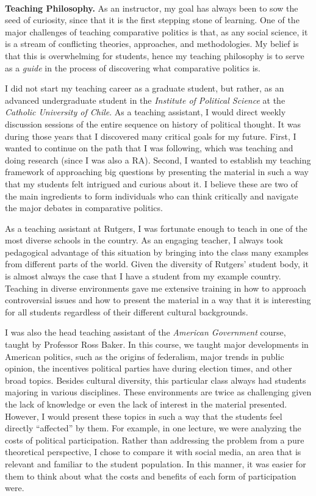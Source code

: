 \vspace{-2cm}{\bf \huge Teaching Statement}\\

{\bf Teaching Philosophy.} As an instructor, my goal has always been to sow the seed of curiosity, since that it is the first stepping stone of learning. One of the major challenges of teaching comparative politics is that, as any social science, it is a stream of conflicting theories, approaches, and methodologies. My belief is that this is overwhelming for students, hence my teaching philosophy is to serve as a \emph{guide} in the process of discovering what comparative politics is.

I did not start my teaching career as a graduate student, but rather, as an advanced undergraduate student in the \emph{Institute of Political Science} at the \emph{Catholic University of Chile}. As a teaching assistant, I would direct weekly discussion sessions of the entire sequence on history of political thought. It was during those years that I discovered many critical goals for my future. First, I wanted to continue on the path that I was following, which was teaching and doing research (since I was also a RA). Second, I wanted to establish my teaching framework of approaching big questions by presenting the material in such a way that my students felt intrigued and curious about it. I believe these are two of the main ingredients to form individuals who can think critically and navigate the major debates in comparative politics. 

As a teaching assistant at Rutgers, I was fortunate enough to teach in one of the most diverse schools in the country. As an engaging teacher, I always took pedagogical advantage of this situation by bringing into the class many examples from different parts of the world. Given the diversity of Rutgers' student body, it is almost always the case that I have a student from my example country. Teaching in diverse environments gave me extensive training in how to approach controversial issues and how to present the material in a way that it is interesting for all students regardless of their different cultural backgrounds. 

I was also the head teaching assistant of the \emph{American Government} course, taught by Professor Ross Baker. In this course, we taught major developments in American politics, such as the origins of federalism, major trends in public opinion, the incentives political parties have during election times, and other broad topics. Besides cultural diversity, this particular class always had students majoring in various disciplines. These environments are twice as challenging given the lack of knowledge or even the lack of interest in the material presented. However, I would present these topics in such a way that the students feel directly ``affected'' by them. For example, in one lecture, we were analyzing the costs of political participation. Rather than addressing the problem from a pure theoretical perspective, I chose to compare it with social media, an area that is relevant and familiar to the student population. In this manner, it was easier for them to think about what the costs and benefits of each form of participation were. 

